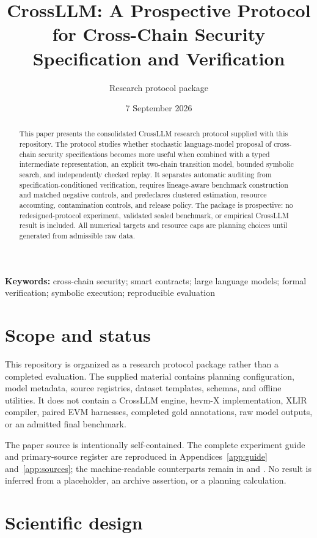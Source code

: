 \documentclass[11pt,a4paper]{article}
\title{CrossLLM: A Prospective Protocol for Cross-Chain Security Specification and Verification}
\author{Research protocol package}
\date{7 September 2026}
\begin{document}
\maketitle

\begin{abstract}
This paper presents the consolidated CrossLLM research protocol supplied with this repository. The protocol studies whether stochastic language-model proposal of cross-chain security specifications becomes more useful when combined with a typed intermediate representation, an explicit two-chain transition model, bounded symbolic search, and independently checked replay. It separates automatic auditing from specification-conditioned verification, requires lineage-aware benchmark construction and matched negative controls, and predeclares clustered estimation, resource accounting, contamination controls, and release policy. The package is prospective: no redesigned-protocol experiment, validated sealed benchmark, or empirical CrossLLM result is included. All numerical targets and resource caps are planning choices until generated from admissible raw data.
\end{abstract}

\textbf{Keywords:} cross-chain security; smart contracts; large language models; formal verification; symbolic execution; reproducible evaluation

\section{Scope and status}

This repository is organized as a research protocol package rather than a completed evaluation. The supplied material contains planning configuration, model metadata, source registries, dataset templates, schemas, and offline utilities. It does not contain a CrossLLM engine, hevm-X implementation, XLIR compiler, paired EVM harnesses, completed gold annotations, raw model outputs, or an admitted final benchmark.

The paper source is intentionally self-contained. The complete experiment guide and primary-source register are reproduced in Appendices~\ref{app:guide} and~\ref{app:sources}; the machine-readable counterparts remain in  and . No result is inferred from a placeholder, an archive assertion, or a planning calculation.

\section{Scientific design}
\end{document}
